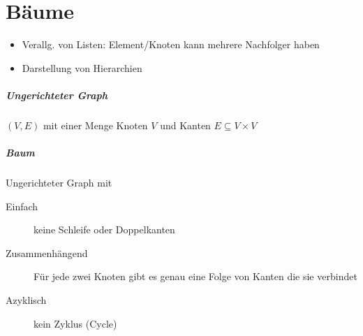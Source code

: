 \chapter{Bäume}

\begin{itemize}
  \item Verallg. von Listen: Element/Knoten kann mehrere Nachfolger haben
  \item Darstellung von Hierarchien
\end{itemize}

\paragraph{Ungerichteter Graph}
$(V, E)$ mit einer Menge Knoten $V$ und Kanten $E \subseteq V \times V$

\paragraph{Baum}
Ungerichteter Graph mit

\begin{mzImportant}
  \begin{description}
    \item [Einfach] keine Schleife
          oder Doppelkanten

    \item [Zusammenhängend]
          Für jede zwei Knoten gibt es genau eine Folge von Kanten die sie verbindet

    \item [Azyklisch]
          kein Zyklus (Cycle)
  \end{description}
\end{mzImportant}

